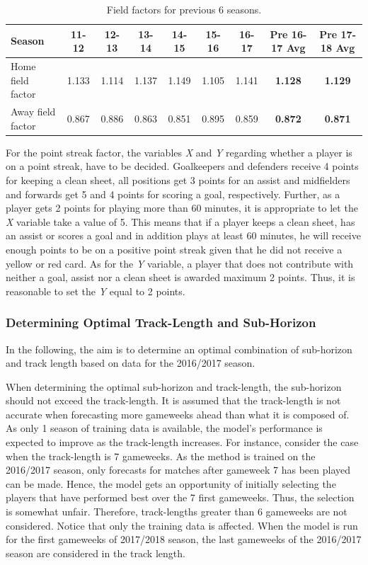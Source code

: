 \begin{table}[H]
\centering
\smaller
\begin{tabular}{|l|c|c|c|c|c|c|c|c|}
\hline
Season & 11-12    & 12-13   & 13-14    & 14-15    & 15-16 & 16-17 & Pre 16-17 Avg & Pre 17-18 Avg \\ 
\hline
Home field factor & 1.133 & 1.114 & 1.137 & 1.149 & 1.105 & 1.141 & \textbf{1.128} & \textbf{1.129}\\
\hline
Away field factor & 0.867 & 0.886 & 0.863 & 0.851 & 0.895 & 0.859 & \textbf{0.872} & \textbf{0.871}\\
\hline
\end{tabular}
\caption{Field factors for previous 6 seasons.}
\label{Field advantage}
\end{table}

For the point streak factor, the variables \textit{X} and \textit{Y} regarding whether a player is on a point streak, have to be decided. Goalkeepers and defenders receive 4 points for keeping a clean sheet, all positions get 3 points for an assist and midfielders and forwards get 5 and 4 points for scoring a goal, respectively. Further, as a player gets 2 points for playing more than 60 minutes, it is appropriate to let the \textit{X} variable take a value of 5. This means that if a player keeps a clean sheet, has an assist or scores a goal and in addition plays at least 60 minutes, he will receive enough points to be on a positive point streak given that he did not receive a yellow or red card. As for the \textit{Y} variable, a player that does not contribute with neither a goal, assist nor a clean sheet is awarded maximum 2 points. Thus, it is reasonable to set the \textit{Y} equal to 2 points. 


\subsubsection{Determining Optimal Track-Length and Sub-Horizon}

In the following, the aim is to determine an optimal combination of sub-horizon and track length based on data for the 2016/2017 season.

\newpar

When determining the optimal sub-horizon and track-length, the sub-horizon should not exceed the track-length. It is assumed that the track-length is not accurate when forecasting more gameweeks ahead than what it is composed of. As only 1 season of training data is available, the model's performance is expected to improve as the track-length increases. For instance, consider the case when the track-length is 7 gameweeks. As the method is trained on the 2016/2017 season, only forecasts for matches after gameweek 7 has been played can be made. Hence, the model gets an opportunity of initially selecting the players that have performed best over the 7 first gameweeks. Thus, the selection is somewhat unfair. Therefore, track-lengths greater than 6 gameweeks are not considered. Notice that only the training data is affected. When the model is run for the first gameweeks of 2017/2018 season, the last gameweeks of the 2016/2017 season are considered in the track length.


